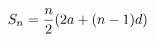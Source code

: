 \documentclass[preview]{standalone}
\begin{document}
\begin{align*}
\special{dvisvgm:raw <g id='unique000'>}S_n = \frac{n}{2}(2a + (n-1)d)\special{dvisvgm:raw </g>}
\end{align*}
\end{document}
